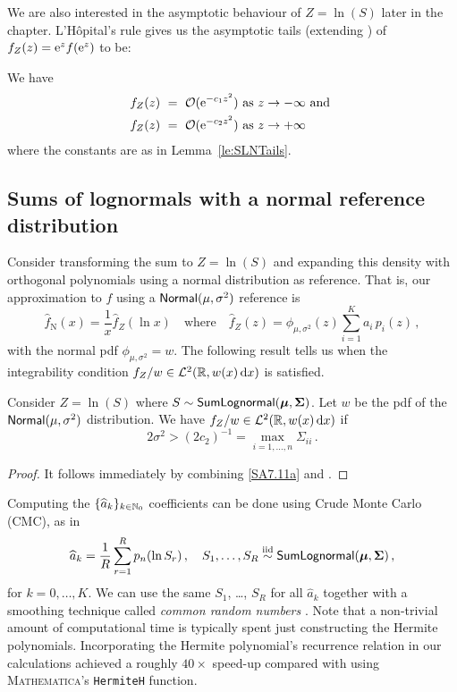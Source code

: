 We are also interested in the asymptotic behaviour of $Z = \ln(S)$ later in the chapter. L'H\^opital's rule gives us the asymptotic tails (extending \cite{gao2009asymptotic}) of $f_Z(z) = \mathrm{e}^{z}f(\mathrm{e}^{z})$ to be:

\begin{corollary} \label{co:LogSLNTails}
We have
\begin{align} \label{LogSLNLeftTail}
	f_Z(z)  \ &=\  {\mathcal{O}}(\mathrm{e}^{-c_1 z^2} ) \text{\ as } z\to -\infty
	 \text{ and } \\
 \label{LogSLNRightTail}
	f_Z(z) \ &=\ {\mathcal{O}}(\mathrm{e}^{-c_2 z^2}) \text{\ as } z \to +\infty
\end{align}
where the constants are as in Lemma~\ref{le:SLNTails}.
\end{corollary}

\subsection{Sums of lognormals with a normal reference distribution} \label{SS:LNNormalNu}

Consider transforming the sum to $Z=\ln(S)$ and expanding this density with orthogonal polynomials using a normal distribution as reference. That is, our approximation to $f$ using a $\mathsf{Normal}(\mu, \sigma^2)$ reference is
\[ \widehat{f}_{\mathrm{N}}(x) = \frac{1}{x} \widehat{f}_{Z}\left(\ln x \right) \quad\text{where}\quad \widehat{f}_{Z}(z) = \phi_{\mu,\sigma^2}(z) \sum_{i=1}^K a_i \, p_i(z) \,, \]
with  the normal pdf $\phi_{\mu,\sigma^2}=w$. The following result tells us when the integrability condition $f_{Z}/w \in\mathcal{L}^2(\mathbb{R}, w(x) \mathop{}\!\mathrm{d} x)$ is satisfied.


\begin{proposition}\label{eq:IntegrabilityConditionNormalHermiteExpansion}
Consider $Z=\ln(S)$ where $S \sim \mathsf{SumLognormal}(\bm{\mu},\bm{\Sigma})$. Let $w$ be the pdf of the $\mathsf{Normal}(\mu,\sigma^2)$ distribution. We have $f_Z / w \in\mathcal{L}^2(\mathbb{R}, w(x) \mathop{}\!\mathrm{d} x)$ if
\begin{equation} \label{normal_int_cond_1}
	2 \sigma^2 > (2 c_2)^{-1} = \max_{i=1,\dots,n} \Sigma_{ii} \,.
\end{equation}
\end{proposition}

\begin{proof}
It follows immediately by combining \eqref{SA7.11a} and .
\end{proof}

Computing the $\{ \widehat{a}_k \}_{k \in \mathbb{N}_0}$ coefficients can be done using Crude Monte Carlo (CMC), as in
\[ \widehat{a}_k = \frac1R \sum_{r=1}^R p_n(\ln S_r) \,, \quad S_1, \dots, S_R \overset{\smash{\mathrm{iid}}}{\sim} \mathsf{SumLognormal}(\bm{\mu}, \bm{\Sigma}) \,, \]
for $k = 0, \dots, K$. We can use the same $S_1$, \dots, $S_R$ for all $\widehat{a}_k$ together with a smoothing technique called \emph{common random numbers} \cite{asmussen2007stochastic,glasserman2003monte}. Note that a non-trivial amount of computational time is typically spent just constructing the Hermite polynomials. Incorporating the Hermite polynomial's recurrence relation in our calculations achieved a roughly $40\times$ speed-up compared with using \textsc{Mathematica}'s \texttt{HermiteH} function.


